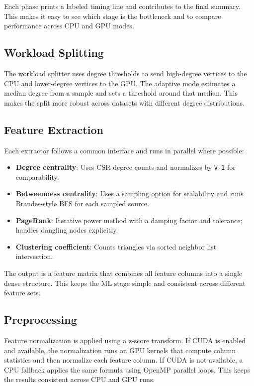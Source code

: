 \documentclass[11pt]{article}
\begin{document}
Each phase prints a labeled timing line and contributes to the final summary. This makes it easy to see which stage is the bottleneck and to compare performance across CPU and GPU modes.

\subsection{Workload Splitting}
The workload splitter uses degree thresholds to send high-degree vertices to the CPU and lower-degree vertices to the GPU. The adaptive mode estimates a median degree from a sample and sets a threshold around that median. This makes the split more robust across datasets with different degree distributions.

\subsection{Feature Extraction}
Each extractor follows a common interface and runs in parallel where possible:
\begin{itemize}
  \item \textbf{Degree centrality}: Uses CSR degree counts and normalizes by \texttt{V-1} for comparability.
  \item \textbf{Betweenness centrality}: Uses a sampling option for scalability and runs Brandes-style BFS for each sampled source.
  \item \textbf{PageRank}: Iterative power method with a damping factor and tolerance; handles dangling nodes explicitly.
  \item \textbf{Clustering coefficient}: Counts triangles via sorted neighbor list intersection.
\end{itemize}

The output is a feature matrix that combines all feature columns into a single dense structure. This keeps the ML stage simple and consistent across different feature sets.

\subsection{Preprocessing}
Feature normalization is applied using a z-score transform. If CUDA is enabled and available, the normalization runs on GPU kernels that compute column statistics and then normalize each feature column. If CUDA is not available, a CPU fallback applies the same formula using OpenMP parallel loops. This keeps the results consistent across CPU and GPU runs.
\end{document}
